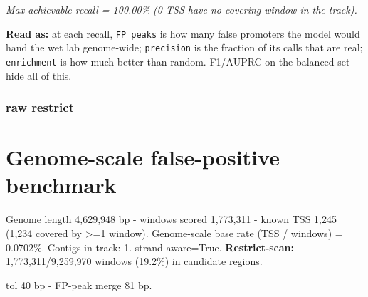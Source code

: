 \documentclass[10pt]{article}
\begin{document}
\begin{center}
\end{center}

{\itshape Max achievable recall = 100.00\% (0 TSS have no covering window in the track).}

\textbf{Read as:} at each recall, \texttt{FP peaks} is how many false promoters the model would hand the wet lab genome-wide; \texttt{precision} is the fraction of its calls that are real; \texttt{enrichment} is how much better than random. F1/AUPRC on the balanced set hide all of this.

\subsubsection*{raw \textperiodcentered{} restrict}
\section*{Genome-scale false-positive benchmark}

Genome length 4,629,948 bp - windows scored 1,773,311 - known TSS 1,245 (1,234 covered by >=1 window). Genome-scale base rate (TSS / windows) = 0.0702\%. Contigs in track: 1. strand-aware=True. \textbf{Restrict-scan:} 1,773,311/9,259,970 windows (19.2\%) in candidate regions.

tol 40 bp - FP-peak merge 81 bp.

\begin{center}
\end{center}
\end{document}
